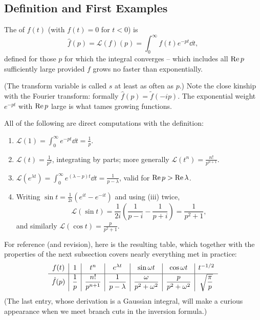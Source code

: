 \documentclass[a4paper]{scrartcl}
\begin{document}
\subsection{Definition and First Examples}

\begin{definition}
	The  of $f(t)$ (with $f(t) = 0$ for $t < 0$) is
	$$
	\hat f(p) = \mathcal{L}(f)(p) = \int_0^\infty f(t) e^{-pt} \dd t,
	$$
	defined for those $p$ for which the integral converges -- which includes all $\operatorname{Re} p$ sufficiently large provided $f$ grows no faster than exponentially.
\end{definition}

(The transform variable is called $s$ at least as often as $p$.) Note the close kinship with the Fourier transform: formally $\hat f(p) = \tilde f(-ip)$. The exponential weight $e^{-pt}$ with $\operatorname{Re} p$ large is what tames growing functions.

\begin{example}
	All of the following are direct computations with the definition:
	\begin{enumerate}[label=(\roman*)]
		\item $\displaystyle \mathcal L(1) = \int_0^\infty e^{-pt}\dd t = \frac 1p$.
		\item $\displaystyle \mathcal L(t) = \frac{1}{p^2}$, integrating by parts; more generally $\mathcal L(t^n) = \frac{n!}{p^{n+1}}$.
		\item $\displaystyle \mathcal L(e^{\lambda t}) = \int_0^\infty e^{(\lambda - p)t} \dd t = \frac{1}{p - \lambda}$, valid for $\operatorname{Re} p > \operatorname{Re} \lambda$.
		\item Writing $\sin t = \frac{1}{2i}(e^{it} - e^{-it})$ and using (iii) twice,
		$$
		\mathcal L (\sin t) = \frac{1}{2i}\left(\frac{1}{p - i} - \frac{1}{p + i}\right) = \frac{1}{p^2 + 1},
		$$
		and similarly $\mathcal L(\cos t) = \frac{p}{p^2 + 1}$.
	\end{enumerate}
\end{example}

For reference (and revision), here is the resulting table, which together with the properties of the next subsection covers nearly everything met in practice:
$$
\begin{array}{c|c|c|c|c|c|c}
	f(t) & 1 & t^n & e^{\lambda t} & \sin \omega t & \cos \omega t & t^{-1/2} \\[2pt]
	\hline
	\rule{0pt}{14pt}\hat f(p) & \dfrac 1p & \dfrac{n!}{p^{n+1}} & \dfrac{1}{p - \lambda} & \dfrac{\omega}{p^2 + \omega^2} & \dfrac{p}{p^2 + \omega^2} & \sqrt{\dfrac{\pi}{p}}
\end{array}
$$
(The last entry, whose derivation is a Gaussian integral, will make a curious appearance when we meet branch cuts in the inversion formula.)
\end{document}
